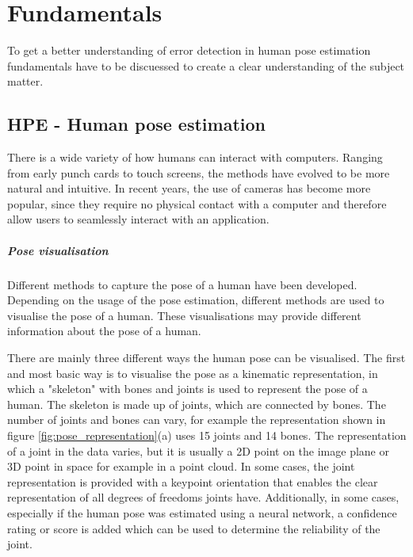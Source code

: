 \chapter{Fundamentals}
\label{sec:fundamentals}

To get a better understanding of error detection in human pose estimation fundamentals have to be discuessed to create a clear understanding of the subject matter.

\section{HPE - Human pose estimation}

There is a wide variety of how humans can interact with computers. Ranging from early punch cards to touch screens, the methods have evolved to be more natural and intuitive. In recent years, the use of cameras has become more popular, since they require no physical contact with a computer and therefore allow users to seamlessly interact with an application.

\paragraph{Pose visualisation}

Different methods to capture the pose of a human have been developed. Depending on the usage of the pose estimation, different methods are used to visualise the pose of a human. These visualisations may provide different information about the pose of a human.

There are mainly three different ways the human pose can be visualised. The first and most basic way is to visualise the pose as a kinematic representation, in which a "skeleton" with bones and joints is used to represent the pose of a human. The skeleton is made up of joints, which are connected by bones. The number of joints and bones can vary, for example the representation shown in figure \ref{fig:pose_representation}(a) uses 15 joints and 14 bones. The representation of a joint in the data varies, but it is usually a 2D point on the image plane or 3D point in space for example in a point cloud. In some cases, the joint representation is provided with a keypoint orientation that enables the clear representation of all degrees of freedoms joints have\cite{KeypointOrientation}. Additionally, in some cases, especially if the human pose was estimated using a neural network, a confidence rating or score is added which can be used to determine the reliability of the joint.

